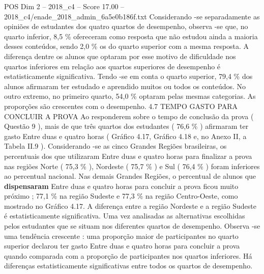 \begin{textsample}{POS Dim 2 – 2018\_c4 – Score 17.00 – 2018\_c4/enade\_2018\_admin\_6a5e0b186f.txt}
Considerando -se separadamente as opiniões de estudantes dos quatro quartos de desempenho, observa -se que, no quarto inferior, 8,5 \% ofereceram como resposta que não estudou ainda a maioria desses conteúdos, sendo 2,0 \% os do quarto superior com a mesma resposta.
A diferença dentre os alunos que optaram por esse motivo de dificuldade nos quartos inferiores em relação aos quartos superiores de desempenho é estatisticamente significativa.
Tendo -se em conta o quarto superior, 79,4 \% dos alunos afirmaram ter estudado e aprendido muitos ou todos os conteúdos.
No outro extremo, no primeiro quarto, 54,0 \% optaram pelas mesmas categorias.
As proporções são crescentes com o desempenho. 4.7 TEMPO GASTO PARA CONCLUIR A PROVA Ao responderem sobre o tempo de conclusão da prova ( Questão 9 ), mais de que três quartos dos estudantes ( 76,6 \% ) afirmaram ter gasto Entre duas e quatro horas ( Gráfico 4.17, Gráfico 4.18 e, no Anexo II, a Tabela II.9 ).
Considerando -se as cinco Grandes Regiões brasileiras, os percentuais dos que utilizaram Entre duas e quatro horas para finalizar a prova nas regiões Norte ( 75,3 \% ), Nordeste ( 75,7 \% ) e Sul ( 76,4 \% ) foram inferiores ao percentual nacional.
Nas demais Grandes Regiões, o percentual de alunos que \textbf{dispensaram} Entre duas e quatro horas para concluir a prova ficou muito próximo ; 77,1 \% na região Sudeste e 77,3 \% na região Centro-Oeste, como mostrado no Gráfico 4.17.
A diferença entre a região Nordeste e a região Sudeste é estatisticamente significativa.
Uma vez analisadas as alternativas escolhidas pelos estudantes que se situam nos diferentes quartos de desempenho.
Observa -se uma tendência crescente : uma proporção maior de participantes no quarto superior declarou ter gasto Entre duas e quatro horas para concluir a prova quando comparada com a proporção de participantes nos quartos inferiores.
Há diferenças estatisticamente significativas entre todos os quartos de desempenho.

\end{textsample}
